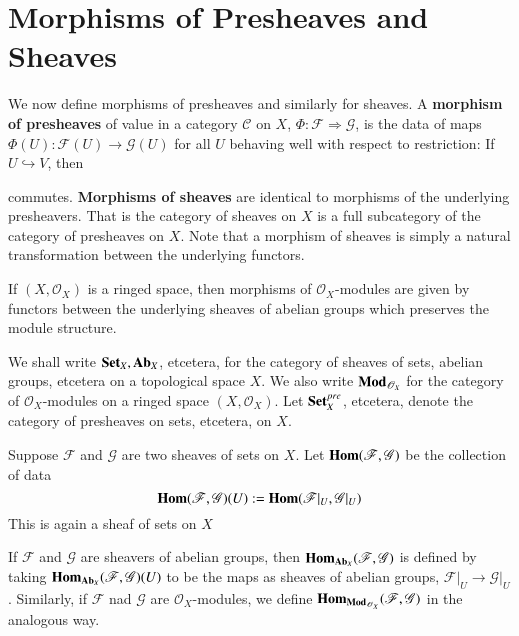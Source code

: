 \section{Morphisms of Presheaves and Sheaves}

We now define morphisms of presheaves and similarly for sheaves. A \textbf{morphism of presheaves} of value in a category $\mathscr{C}$ on $X$, $\Phi:\mathscr{F}\Rightarrow \mathscr{G}$, is the data of maps $\Phi(U):\mathscr{F}(U)\rightarrow \mathscr{G}(U)$ for all $U$ behaving well with respect to restriction: If $U\hookrightarrow V$, then  
\begin{center}
\end{center}
commutes. \textbf{Morphisms of sheaves} are identical to morphisms of the underlying presheavers. That is the category of sheaves on $X$ is a full subcategory of the category of presheaves on $X$. Note that a morphism of sheaves is simply a natural transformation between the underlying functors. 

If $(X,\mathscr{O}_X)$ is a ringed space, then morphisms of $\mathscr{O}_X$-modules are given by functors between the underlying sheaves of abelian groups which preserves the module structure.

We shall write $\normalfont\textbf{Set}_X,\normalfont\textbf{Ab}_X$, etcetera, for the category of sheaves of sets, abelian groups, etcetera on a topological space $X$. We also write $\normalfont\textbf{Mod}_{\mathscr{O}_X}$ for the category of $\mathscr{O}_X$-modules on a ringed space $(X,\mathscr{O}_X)$. Let $\normalfont\textbf{Set}_X^{pre}$, etcetera, denote the category of presheaves on sets, etcetera, on $X$.
\begin{definition}
    Suppose $\mathscr{F}$ and $\mathscr{G}$ are two sheaves of sets on $X$. Let $\mathbf{Hom}(\mathscr{F},\mathscr{G})$ be the collection of data $$\mathbf{Hom}(\mathscr{F},\mathscr{G})(U) := \mathbf{Hom}(\mathscr{F}\vert_U,\mathscr{G}\vert_U)$$
    This is again a sheaf of sets on $X$
\end{definition}

If $\mathscr{F}$ and $\mathscr{G}$ are sheavers of abelian groups, then $\mathbf{Hom}_{\normalfont\textbf{Ab}_X}(\mathscr{F},\mathscr{G})$ is defined by taking $\mathbf{Hom}_{\normalfont\textbf{Ab}_X}(\mathscr{F},\mathscr{G})(U)$ to be the maps as sheaves of abelian groups, $\mathscr{F}\vert_U\rightarrow \mathscr{G}\vert_U$. Similarly, if $\mathscr{F}$ nad $\mathscr{G}$ are $\mathscr{O}_X$-modules, we define $\mathbf{Hom}_{\normalfont\textbf{Mod}_{\mathscr{O}_X}}(\mathscr{F},\mathscr{G})$ in the analogous way. 


